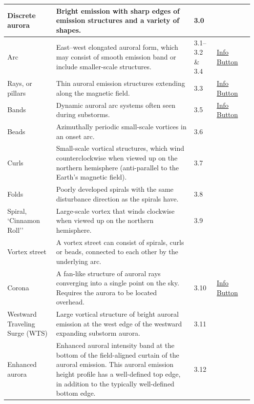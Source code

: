 \documentclass{article}
\begin{document}
\begin{longtable}{|p{1.5cm}|p{6.5cm}|p{1cm}|p{1.75cm}|p{1.8cm}|}
Discrete aurora & Bright emission with sharp edges of emission structures and a variety of shapes. & 3.0 &  &  \\
\hline
Arc & East--west elongated auroral form, which may consist of smooth emission band or include smaller-scale structures. & 3.1--3.2 \& 3.4 & \href{https://www.taivaanvahti.fi/observations/info/2/en}{Info Button} & \textcite{Karlsson2020}\\
\hline
Rays, or pillars & Thin auroral emission structures extending along the magnetic field. & 3.3 & \href{https://www.taivaanvahti.fi/observations/info/4/en}{Info Button} &  \\
\hline
Bands & Dynamic auroral arc systems often seen during substorms. & 3.5 & \href{https://www.taivaanvahti.fi/observations/info/3/en}{Info Button} &  \\
\hline
Beads & Azimuthally periodic small-scale vortices in an onset arc. & 3.6 &  & \textcite{Motoba2012} \\
\hline
Curls & Small-scale vortical structures, which wind counterclockwise when viewed up on the northern hemisphere (anti-parallel to the Earth's magnetic field). & 3.7 &  & \textcite{Trondsen1998} \\
\hline
Folds & Poorly developed spirals with the same disturbance direction as the spirals have. & 3.8 &  & \textcite{Hallinan1976} \\
\hline
Spiral, `Cinnamon Roll'' & Large-scale vortex that winds clockwise when viewed up on the northern hemisphere. & 3.9 &  & \textcite{Hallinan1976} \\
\hline
Vortex street & A vortex street can consist of spirals, curls or beads, connected to each other by the underlying arc. &  &  &  \\
\hline
Corona & A fan-like structure of auroral rays converging into a single point on the sky. Requires the aurora to be located overhead. & 3.10 & \href{https://www.taivaanvahti.fi/observations/info/6/en}{Info Button} &  \\
\hline
Westward Traveling Surge (WTS) & Large vortical structure of bright auroral emission at the west edge of the westward expanding substorm aurora. & 3.11 &  & \textcite{Wei2021} \\
\hline
Enhanced aurora & Enhanced auroral intensity band at the bottom of the field-aligned curtain of the auroral emission. This auroral emission height profile has a well-defined top edge, in addition to the typically well-defined bottom edge. & 3.12 &  & \textcite{Hallinan1997} \\
\hline


\end{longtable}
\end{document}
